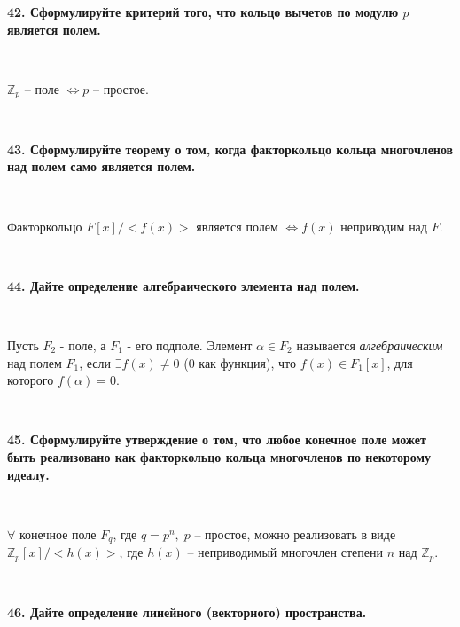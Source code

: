 \documentclass{article}
\begin{document}
    \textbf{42. Сформулируйте критерий того, что кольцо вычетов по модулю $p$ является полем.}

    {
        $\;$
        \setlength{\parindent}{0.4cm}
        \hangindent=0.4cm

        $\mathbb{Z}_p$ -- поле $\Leftrightarrow p$ -- простое.

        $\;$
        \setlength{\parindent}{0cm}
        \hangindent=0cm
    }

    \newpage

    \textbf{43. Сформулируйте теорему о том, когда факторкольцо кольца многочленов над полем само является полем.}

    {
        $\;$
        \setlength{\parindent}{0.4cm}
        \hangindent=0.4cm

    Факторкольцо $F[x]/<f(x)>$ является полем $\Leftrightarrow f(x)$ неприводим над $F$.

        $\;$
        \setlength{\parindent}{0cm}
        \hangindent=0cm
    }

    \textbf{44. Дайте определение алгебраического элемента над полем.}

    {
        $\;$
        \setlength{\parindent}{0.4cm}
        \hangindent=0.4cm

    Пусть $F_2$ - поле, а $F_1$ - его подполе. Элемент $\alpha\in F_2$ называется \textit{алгебраическим} над полем $F_1$, если $\exists f(x)\ne0$ (0 как функция), что $f(x)\in F_1[x]$, для которого $f(\alpha)=0$.

        $\;$
        \setlength{\parindent}{0cm}
        \hangindent=0cm
    }



    \textbf{45. Сформулируйте утверждение о том, что любое конечное поле может быть реализовано как факторкольцо кольца многочленов по некоторому идеалу.}

    {
        $\;$
        \setlength{\parindent}{0.4cm}
        \hangindent=0.4cm

        $\forall$ конечное поле $F_q$, где $q=p^n, \;p$ -- простое, можно реализовать в виде $\mathbb{Z}_p[x]/<h(x)>$, где $h(x)$ -- неприводимый многочлен степени $n$ над $\mathbb{Z}_p$.

        $\;$
        \setlength{\parindent}{0cm}
        \hangindent=0cm
    }



    \textbf{46. Дайте определение линейного (векторного) пространства.}
\end{document}
